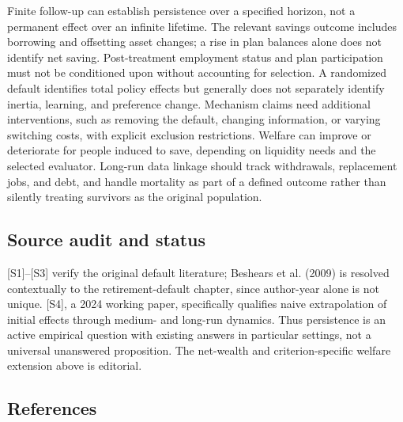 \documentclass[11pt,a4paper]{article}
\begin{document}
Finite follow-up can establish persistence over a specified horizon, not a permanent effect over an infinite lifetime. The relevant savings outcome includes borrowing and offsetting asset changes; a rise in plan balances alone does not identify net saving. Post-treatment employment status and plan participation must not be conditioned upon without accounting for selection. A randomized default identifies total policy effects but generally does not separately identify inertia, learning, and preference change. Mechanism claims need additional interventions, such as removing the default, changing information, or varying switching costs, with explicit exclusion restrictions. Welfare can improve or deteriorate for people induced to save, depending on liquidity needs and the selected evaluator. Long-run data linkage should track withdrawals, replacement jobs, and debt, and handle mortality as part of a defined outcome rather than silently treating survivors as the original population.

\subsection*{Source audit and status}

[S1]--[S3] verify the original default literature; Beshears et al. (2009) is resolved contextually to the retirement-default chapter, since author-year alone is not unique. [S4], a 2024 working paper, specifically qualifies naive extrapolation of initial effects through medium- and long-run dynamics. Thus persistence is an active empirical question with existing answers in particular settings, not a universal unanswered proposition. The net-wealth and criterion-specific welfare extension above is editorial.

\subsection*{References}
\end{document}
